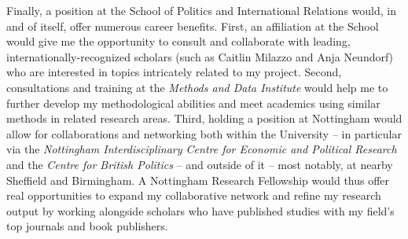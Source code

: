 \documentclass[fontsize=10.5pt,letterpaper]{scrartcl}
\begin{document}
Finally, a position at the School of Politics and International Relations would, in and of itself, offer numerous career benefits. First, an affiliation at the School would give me the opportunity to consult and collaborate with leading, internationally-recognized scholars (such as Caitlin Milazzo and Anja Neundorf) who are interested in topics intricately related to my project. Second, consultations and training at the \textit{Methods and Data Institute} would help me to further develop my methodological abilities and meet academics using similar methods in related research areas. Third, holding a position at Nottingham would allow for collaborations and networking both within the University -- in particular via the \textit{Nottingham Interdisciplinary Centre for Economic and Political Research} and the \textit{Centre for British Politics} -- and outside of it -- most notably, at nearby Sheffield and Birmingham. A Nottingham Research Fellowship would thus offer real opportunities to expand my collaborative network and refine my research output by working alongside scholars who have published studies with my field’s top journals and book publishers.
\end{document}
